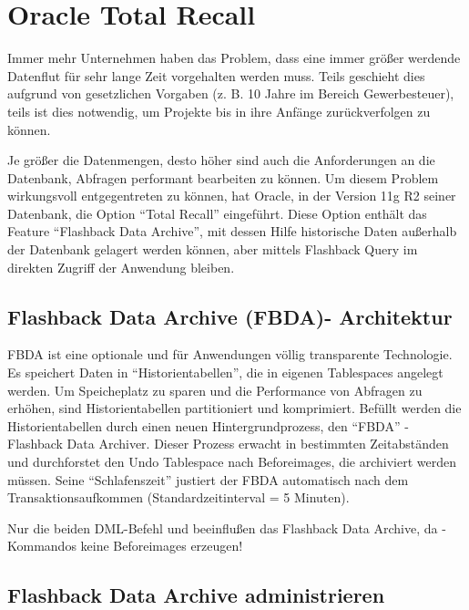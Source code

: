     \section{Oracle Total Recall}
      Immer mehr Unternehmen haben das Problem, dass eine immer gr\"o\ss{}er werdende Datenflut f\"ur sehr lange Zeit vorgehalten werden muss. Teils geschieht dies aufgrund von gesetzlichen Vorgaben (z. B. 10 Jahre im Bereich Gewerbesteuer), teils ist dies notwendig, um Projekte bis in ihre Anf\"ange zur\"uckverfolgen zu k\"onnen.

      Je gr\"o\ss{}er die Datenmengen, desto h\"oher sind auch die Anforderungen an die Datenbank, Abfragen performant bearbeiten zu k\"onnen. Um diesem Problem wirkungsvoll entgegentreten zu k\"onnen, hat Oracle, in der Version 11g R2 seiner Datenbank, die Option \enquote{Total Recall} eingef\"uhrt. Diese Option enth\"alt das Feature \enquote{Flashback Data Archive}, mit dessen Hilfe historische Daten au\ss{}erhalb der Datenbank gelagert werden k\"onnen, aber mittels Flashback Query im direkten Zugriff der Anwendung bleiben.
      \subsection{Flashback Data Archive (FBDA)- Architektur}
        FBDA ist eine optionale und f\"ur Anwendungen v\"ollig transparente Technologie. Es speichert Daten in \enquote{Historientabellen}, die in eigenen Tablespaces angelegt werden. Um Speicheplatz zu sparen und die Performance von Abfragen zu erh\"ohen, sind Historientabellen partitioniert und komprimiert.
\clearpage
        Bef\"ullt werden die Historientabellen durch einen neuen Hintergrundprozess, den \enquote{FBDA} - Flashback Data Archiver. Dieser Prozess erwacht in bestimmten Zeitabst\"anden und durchforstet den Undo Tablespace nach Beforeimages, die archiviert werden m\"ussen. Seine \enquote{Schlafenszeit} justiert der FBDA automatisch nach dem Transaktionsaufkommen (Standardzeitinterval = 5 Minuten).
        \begin{merke}
          Nur die beiden DML-Befehl  und  beeinflu\ss{}en das Flashback Data Archive, da -Kommandos keine Beforeimages erzeugen!
        \end{merke}
      \subsection{Flashback Data Archive administrieren}
